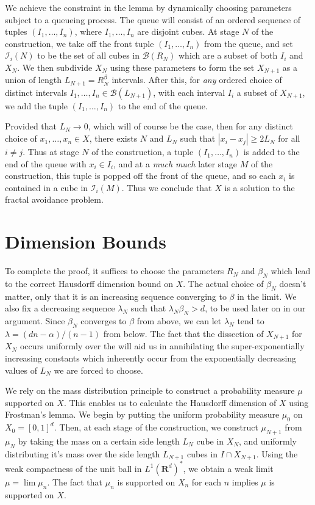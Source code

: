 \documentclass{article}
\theoremstyle{plain}
\theoremstyle{plain}
\begin{document}
\begin{multicols}{2}

We achieve the constraint in the lemma by dynamically choosing parameters subject to a queueing process. The queue will consist of an ordered sequence of tuples $(I_1, \dots, I_n)$, where $I_1 ,\dots, I_n$ are disjoint cubes. At stage $N$ of the construction, we take off the front tuple $(I_1, \dots, I_n)$ from the queue, and set $\mathcal{I}_i(N)$ to be the set of all cubes in $\mathcal{B}(R_N)$ which are a subset of both $I_i$ and $X_N$. We then subdivide $X_N$ using these parameters to form the set $X_{N+1}$ as a union of length $L_{N+1} = R_N^\beta$ intervals. After this, for {\it any} ordered choice of distinct intervals $I_1, \dots, I_n \in \mathcal{B}(L_{N+1})$, with each interval $I_i$ a subset of $X_{N+1}$, we add the tuple $(I_1, \dots, I_n)$ to the end of the queue.

Provided that $L_N \to 0$, which will of course be the case, then for any distinct choice of $x_1, \dots, x_n \in X$, there exists $N$ and $L_N$ such that $|x_i - x_j| \geq 2 L_N$ for all $i \neq j$. Thus at stage $N$ of the construction, a tuple $(I_1, \dots, I_n)$ is added to the end of the queue with $x_i \in I_i$, and at a {\it much} {\it much} later stage $M$ of the construction, this tuple is popped off the front of the queue, and so each $x_i$ is contained in a cube in $\mathcal{I}_i(M)$. Thus we conclude that $X$ is a solution to the fractal avoidance problem.

\section{Dimension Bounds}

To complete the proof, it suffices to choose the parameters $R_N$ and $\beta_N$ which lead to the correct Hausdorff dimension bound on $X$. The actual choice of $\beta_N$ doesn't matter, only that it is an increasing sequence converging to $\beta$ in the limit. We also fix a decreasing sequence $\lambda_N$ such that $\lambda_N \beta_N > d$, to be used later on in our argument. Since $\beta_N$ converges to $\beta$ from above, we can let $\lambda_N$ tend to $\lambda = (dn - \alpha)/(n - 1)$ from below. The fact that the dissection of $X_{N+1}$ for $X_N$ occurs uniformly over the will aid us in annihilating the super-exponentially increasing constants which inherently occur from the exponentially decreasing values of $L_N$ we are forced to choose.

We rely on the mass distribution principle to construct a probability measure $\mu$ supported on $X$. This enables us to calculate the Hausdorff dimension of $X$ using Frostman's lemma. We begin by putting the uniform probability measure $\mu_0$ on $X_0 = [0,1]^d$. Then, at each stage of the construction, we construct $\mu_{N+1}$ from $\mu_N$ by taking the mass on a certain side length $L_N$ cube in $X_N$, and uniformly distributing it's mass over the side length $L_{N+1}$ cubes in $I \cap X_{N+1}$. Using the weak compactness of the unit ball in $L^1(\mathbf{R}^d)^*$, we obtain a weak limit $\mu = \lim \mu_n$. The fact that $\mu_n$ is supported on $X_n$ for each $n$ implies $\mu$ is supported on $X$.


\end{multicols}
\end{document}
